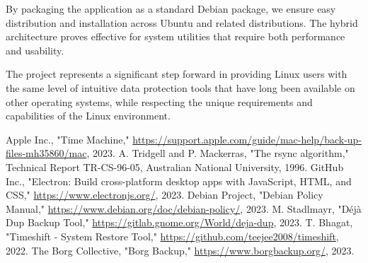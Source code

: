 \documentclass[journal,twoside,10pt]{IEEEtran}
\begin{document}
By packaging the application as a standard Debian package, we ensure easy distribution and installation across Ubuntu and related distributions. The hybrid architecture proves effective for system utilities that require both performance and usability.

The project represents a significant step forward in providing Linux users with the same level of intuitive data protection tools that have long been available on other operating systems, while respecting the unique requirements and capabilities of the Linux environment.

\begin{thebibliography}{00}
 Apple Inc., "Time Machine," \url{https://support.apple.com/guide/mac-help/back-up-files-mh35860/mac}, 2023.
 A. Tridgell and P. Mackerras, "The rsync algorithm," Technical Report TR-CS-96-05, Australian National University, 1996.
 GitHub Inc., "Electron: Build cross-platform desktop apps with JavaScript, HTML, and CSS," \url{https://www.electronjs.org/}, 2023.
 Debian Project, "Debian Policy Manual," \url{https://www.debian.org/doc/debian-policy/}, 2023.
 M. Stadlmayr, "Déjà Dup Backup Tool," \url{https://gitlab.gnome.org/World/deja-dup}, 2023.
 T. Bhagat, "Timeshift - System Restore Tool," \url{https://github.com/teejee2008/timeshift}, 2022.
 The Borg Collective, "Borg Backup," \url{https://www.borgbackup.org/}, 2023.
\end{thebibliography}
\end{document}

